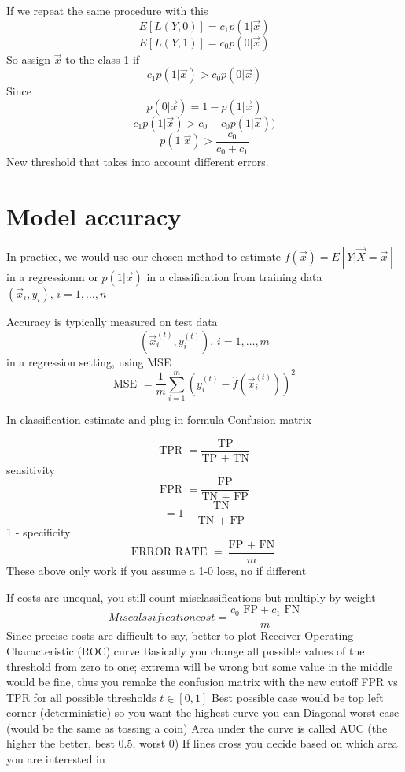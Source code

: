     If we repeat the same procedure with this 
    $$E[L(Y,0)] = c_1 p(1|\vec{x})$$
    $$E[L(Y,1)] = c_0 p(0|\vec{x})$$
    So assign $\vec{x}$ to the class 1 if 
    $$c_1 p(1|\vec{x}) > c_0 p(0|\vec{x})$$
    Since $$p(0|\vec{x}) = 1 - p(1|\vec{x})$$
    $$c_1 p(1|\vec{x}) > c_0 - c_0 p(1|\vec{x}))$$
    $$p(1|\vec{x}) > \frac{c_0}{c_0 + c_1}$$
    New threshold that takes into account different errors.

  \section{Model accuracy}
    In practice, we would use our chosen method to estimate $f(\vec{x})=E[Y|\vec{X}=\vec{x}]$ in a regressionm or $p(1|\vec{x})$ in a classification from training data $(\vec{x}_i, y_i), \, i = 1, \dots, n$

    Accuracy is typically measured on test data 
    $$ (\vec{x}_i^{(t)}, y_i^{(t)}), \, i = 1, \dots, m $$
    in a regression setting, using MSE
    $$\text{MSE } = \frac{1}{m} \sum_{i = 1}^{m}(y_i^{(t)} - \hat{f}(\vec{x}_i^{(t)}))^2$$

    In classification estimate and plug in formula
    Confusion matrix 

    $$\text{TPR } = \frac{\text{TP}}{\text{TP } + \text{ TN}}$$ sensitivity 
    $$\text{FPR } = \frac{\text{FP}}{\text{TN } + \text{ FP}}$$
    $$ = 1 - \frac{\text{TN}}{\text{TN } + \text{ FP}}$$ 1 - specificity
    $$\text{ERROR RATE } = \frac{\text{FP } + \text{ FN}}{m}$$ 
    These above only work if you assume a 1-0 loss, no if different

    If costs are unequal, you still count misclassifications but multiply by weight
    $$Miscalssification cost = \frac{c_0 \text{ FP} + c_1 \text{ FN}}{m}$$
    Since precise costs are difficult to say, better to plot Receiver Operating Characteristic (ROC) curve
    Basically you change all possible values of the threshold from zero to one; extrema will be wrong but some value in the middle would be fine, thus you remake the confusion matrix with the new cutoff
    FPR vs TPR for all possible thresholds $t \in [0, 1]$
    Best possible case would be top left corner (deterministic) so you want the highest curve you can
    Diagonal worst case (would be the same as tossing a coin)
    Area under the curve is called AUC (the higher the better, best 0.5, worst 0)
    If lines cross you decide based on which area you are interested in 
    
    
  